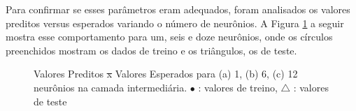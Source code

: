 \documentclass[brazil,tf,epusp]{usp}  %
\providecommand{\DIFadd}[1]{{\protect\color{blue}\uwave{#1}}} %
\providecommand{\DIFdel}[1]{{\protect\color{red}\sout{#1}}}                      %
\providecommand{\DIFaddFL}[1]{\DIFadd{#1}} %
\providecommand{\DIFdelFL}[1]{\DIFdel{#1}} %
\providecommand{\DIFaddbeginFL}{} %
\providecommand{\DIFaddendFL}{} %
\providecommand{\DIFdelbeginFL}{} %
\providecommand{\DIFdelendFL}{} %
\begin{document}
Para confirmar se esses parâmetros eram adequados, foram analisados os valores preditos versus esperados variando o número de neurônios. A Figura \ref{fig:predict_NN} a seguir mostra esse comportamento para um, seis e doze neurônios, onde os círculos preenchidos mostram os dados de treino e os triângulos, os de teste.

\begin{figure}[!h]

\caption{Valores Preditos \DIFdelbeginFL \DIFdelFL{x }\DIFdelendFL \DIFaddbeginFL \DIFaddFL{vs. }\DIFaddendFL Valores Esperados para (a) 1, (b) 6, (c) 12 neurônios na camada intermediária. $\bullet$ : valores de treino, \DIFdelbeginFL \DIFdelFL{$\bigtriangleup$ }\DIFdelendFL \DIFaddbeginFL \DIFaddFL{$\triangledown$ }\DIFaddendFL : valores de teste}
\label{fig:predict_NN}
\end{figure}
\end{document}
